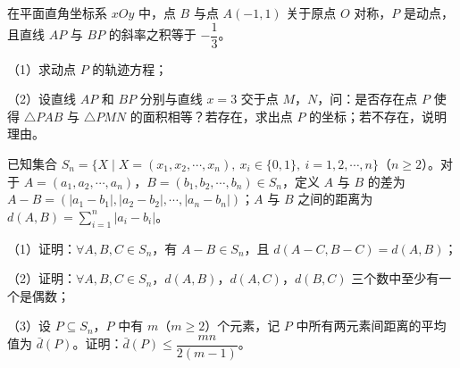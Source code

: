 \begin{question}
在平面直角坐标系 $xOy$ 中，点 $B$ 与点 $A(-1,1)$ 关于原点 $O$ 对称，$P$ 是动点，且直线 $AP$ 与 $BP$ 的斜率之积等于 $-\dfrac13$。

（1）求动点 $P$ 的轨迹方程；

（2）设直线 $AP$ 和 $BP$ 分别与直线 $x=3$ 交于点 $M$，$N$，问：是否存在点 $P$ 使得 $\triangle PAB$ 与 $\triangle PMN$ 的面积相等？若存在，求出点 $P$ 的坐标；若不存在，说明理由。
\nopagebreak[4]
\begin{center}\end{center}
\nopagebreak[4]
\end{question}
\begin{question}
已知集合 $S_n=\{X\mid X=(x_1,x_2,\cdots,x_n),\ x_i\in\{0,1\},\ i=1,2,\cdots,n\}$（$n\geqslant2$）。对于 $A=(a_1,a_2,\cdots,a_n)$，$B=(b_1,b_2,\cdots,b_n)\in S_n$，定义 $A$ 与 $B$ 的差为 $A-B=(|a_1-b_1|,|a_2-b_2|,\cdots,|a_n-b_n|)$；$A$ 与 $B$ 之间的距离为 $d(A,B)=\sum\limits_{i=1}^n|a_i-b_i|$。

（1）证明：$\forall A,B,C\in S_n$，有 $A-B\in S_n$，且 $d(A-C,B-C)=d(A,B)$；

（2）证明：$\forall A,B,C\in S_n$，$d(A,B)$，$d(A,C)$，$d(B,C)$ 三个数中至少有一个是偶数；

（3）设 $P\subseteq S_n$，$P$ 中有 $m$（$m\geqslant2$）个元素，记 $P$ 中所有两元素间距离的平均值为 $\bar d(P)$。证明：$\bar d(P)\leqslant\dfrac{mn}{2(m-1)}$。

\end{question}